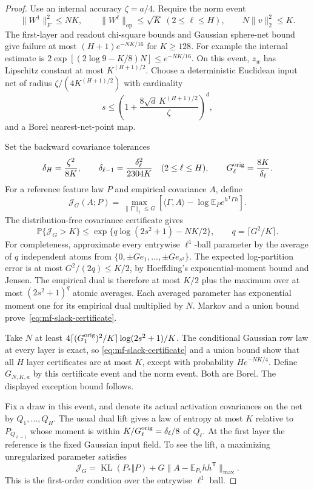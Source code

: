 \begin{proof}
Use an internal accuracy $\zeta=a/4$.
Require the norm event
\[
 \|W^1\|_F^2\leq NK,\qquad
 \|W^\ell\|_{\mathrm{op}}\leq\sqrt K\ (2\leq\ell\leq H),\qquad
 N\|v\|_2^2\leq K.
\]
The first-layer and readout chi-square bounds and Gaussian sphere-net
bound give failure at most $(H+1)e^{-NK/16}$ for $K\geq128$.
For example the internal estimate is
$2\exp[(2\log9-K/8)N]\leq e^{-NK/16}$.
On this event, $z_w$ has Lipschitz constant at most
$K^{(H+1)/2}$.
Choose a deterministic Euclidean input net of radius
$\zeta/(4K^{(H+1)/2})$ with cardinality
\[
 s\leq\left(1+\frac{8\sqrt d\,K^{(H+1)/2}}\zeta\right)^d,
\]
and a Borel nearest-net-point map.

Set the backward covariance tolerances
\begin{equation}
 \delta_H=\frac{\zeta^2}{8K},\qquad
 \delta_{\ell-1}=\frac{\delta_\ell^2}{2304K}
       \quad(2\leq\ell\leq H),\qquad
 G_\ell^{\rm orig}=\frac{8K}{\delta_\ell}.
 \label{eq:mf-entropy-budgets}
\end{equation}
For a reference feature law $P$ and empirical covariance $A$, define
\[
 \mathcal J_G(A;P)=\max_{\|\Gamma\|_1\leq G}
       \left[\langle\Gamma,A\rangle-
               \log\mathbb E_Pe^{h^{\mathsf T}\Gamma h}\right].
\]
The distribution-free covariance certificate gives
\begin{equation}
 \mathbb P\{\mathcal J_G>K\}
 \leq\exp\{q\log(2s^2+1)-NK/2\},\qquad
 q=\lceil G^2/K\rceil.
 \label{eq:mf-slack-certificate}
\end{equation}
For completeness, approximate every entrywise $\ell^1$-ball parameter
by the average of $q$ independent atoms from
$\{0,\pm Ge_1,\ldots,\pm Ge_{s^2}\}$.
The expected log-partition error is at most $G^2/(2q)\leq K/2$,
by Hoeffding's exponential-moment bound and Jensen.
The empirical dual is therefore at most $K/2$ plus the maximum over
at most $(2s^2+1)^q$ atomic averages.  Each averaged parameter has
exponential moment one for its empirical dual multiplied by $N$.
Markov and a union bound prove~\eqref{eq:mf-slack-certificate}.

Take $N$ at least
$4\lceil(G_1^{\rm orig})^2/K\rceil\log(2s^2+1)/K$.
The conditional Gaussian row law at every layer is exact, so
\eqref{eq:mf-slack-certificate} and a union bound show that all
$H$ layer certificates are at most $K$, except with probability
$He^{-NK/4}$.  Define $G_{N,K,a}$ by this certificate event and the
norm event.  Both are Borel.  The displayed exception bound follows.

Fix a draw in this event, and denote its actual activation covariances
on the net by $Q_1,\ldots,Q_H$.
The usual dual lift gives a law of entropy at most $K$ relative to
$P_{Q_{\ell-1}}$ whose moment is within
$K/G_\ell^{\rm orig}=\delta_\ell/8$ of $Q_\ell$.
At the first layer the reference is the fixed Gaussian input field.
To see the lift, a maximizing unregularized parameter satisfies
\[
 \mathcal J_G=\operatorname{KL}(P_*\Vert P)
                 +G\|A-\mathbb E_{P_*}hh^{\mathsf T}\|_{\max}.
\]
This is the first-order condition over the entrywise $\ell^1$ ball.


\end{proof}
